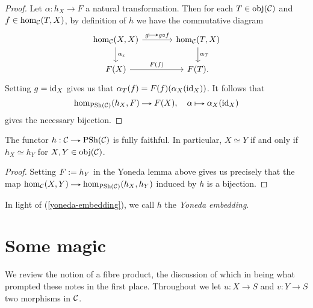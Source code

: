 \begin{proof}
  Let $\alpha : h_X \to F$ a natural transformation. Then for each $T
  \in \operatorname{obj}(\mathcal{C})$ and $f \in \hom_{\mathcal{C}}(T,X)$, by definition of $h$ we have
  the commutative diagram
  \[
  \begin{tikzcd}[column sep = large]
    \hom_\C(X,X) \rar{g \mapsto g \circ f} \dar{\alpha_x} &
    \hom_\C(T,X) \dar{\alpha_T} \\ F(X) \rar{F(f)} & F(T).
  \end{tikzcd}
  \]
  Setting $g = \mathrm{id}_X$ gives us that $\alpha_T(f) =
  F(f)(\alpha_X(\mathrm{id}_X))$. It follows that
  \[
  \hom_{\PSh(\C)}(h_X, F) \to F(X), \quad \alpha \mapsto
  \alpha_X(\id_X)
  \]
  gives the necessary bijection.
\end{proof}

\begin{corollary}
  \label{yoneda-embedding}
  The functor $h : \C \to \PSh(\C)$ is fully faithful. In particular, $X
  \simeq Y$ if and only if $h_X \simeq h_Y$ for $X,Y \in \operatorname{obj}(\mathcal{C})$.
\end{corollary}

\begin{proof}
  Setting $F \mathrel{:=} h_Y$ in the Yoneda lemma above gives us
  precisely that the map $\hom_\C(X,Y) \to \hom_{\PSh(\C)}(h_X,h_Y)$
  induced by $h$ is a bijection.
\end{proof}

\begin{remark}
  In light of (\ref{yoneda-embedding}), we call $h$ the \textit{Yoneda
    embedding}.
\end{remark}


\section{Some magic}

We review the notion of a fibre product, the discussion of which in
\cite{gortzwedhorn} being what prompted these notes in the first
place. Throughout we let $u : X \to S$ and $v : Y \to S$ two morphisms
in $\mathcal{C}$.

